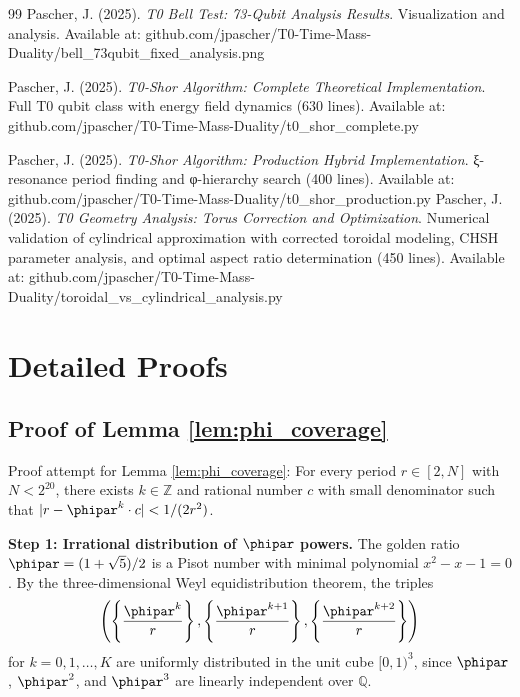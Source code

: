\begin{thebibliography}{99}
	Pascher, J. (2025). 
	\textit{T0 Bell Test: 73-Qubit Analysis Results}. 
	Visualization and analysis. Available at: github.com/jpascher/T0-Time-Mass-Duality/bell\_73qubit\_fixed\_analysis.png
	
	Pascher, J. (2025). 
	\textit{T0-Shor Algorithm: Complete Theoretical Implementation}. 
	Full T0 qubit class with energy field dynamics (630 lines). Available at: github.com/jpascher/T0-Time-Mass-Duality/t0\_shor\_complete.py
	
	Pascher, J. (2025). 
	\textit{T0-Shor Algorithm: Production Hybrid Implementation}. 
	ξ-resonance period finding and φ-hierarchy search (400 lines). Available at: github.com/jpascher/T0-Time-Mass-Duality/t0\_shor\_production.py
	Pascher, J. (2025). 
	\textit{T0 Geometry Analysis: Torus Correction and Optimization}. 
	Numerical validation of cylindrical approximation with corrected toroidal modeling, CHSH parameter analysis, and optimal aspect ratio determination (450 lines). Available at: github.com/jpascher/T0-Time-Mass-Duality/toroidal\_vs\_cylindrical\_analysis.py
\end{thebibliography}

\appendix

\section{Detailed Proofs}
\label{app:proofs}

\subsection{Proof of Lemma \ref{lem:phi_coverage}}
\label{app:proof_phi_coverage}

Proof attempt for Lemma \ref{lem:phi_coverage}: For every period $r \in [2, N]$ with $N < 2^{20}$, there exists $k \in \mathbb{Z}$ and rational number $c$ with small denominator such that $|r - \phipar^k \cdot c| < 1/(2r^2)$.

\textbf{Step 1: Irrational distribution of $\phipar$ powers.}
The golden ratio $\phipar = (1+\sqrt{5})/2$ is a Pisot number with minimal polynomial $x^2 - x - 1 = 0$. By the three-dimensional Weyl equidistribution theorem, the triples
\[
\left(\left\{\frac{\phipar^k}{r}\right\}, \left\{\frac{\phipar^{k+1}}{r}\right\}, \left\{\frac{\phipar^{k+2}}{r}\right\}\right)
\]
for $k = 0, 1, \ldots, K$ are uniformly distributed in the unit cube $[0,1)^3$, since $\phipar$, $\phipar^2$, and $\phipar^3$ are linearly independent over $\mathbb{Q}$.

